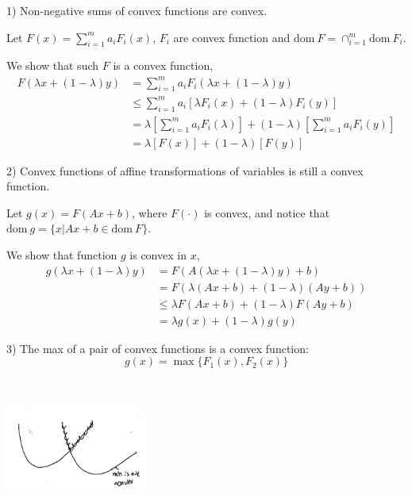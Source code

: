 1) Non-negative sums of convex functions are convex.

Let $F(x) =\sum^m_{i=1}a_iF_i(x)$, $F_i$ are convex function and $\text{dom}\ F = \cap^m_{i=1}\text{dom}\ F_i$. 

We show that such $F$ is a convex function,
\begin{align*}
F(\lambda x + (1-\lambda)y) 
&= \sum^m_{i=1}a_iF_i(\lambda x + (1-\lambda)y)\\
&\leq \sum^m_{i=1}a_i[\lambda F_i(x) + (1-\lambda)F_i(y)]\\
&= \lambda[\sum^m_{i=1}a_iF_i(\lambda)] + (1-\lambda)[\sum^m_{i=1}a_iF_i(y)]\\
&= \lambda[F(x)] + (1-\lambda)[F(y)]
\end{align*}

2) Convex functions of affine transformations of variables is still a convex function.

Let $g(x) =F(Ax + b)$, where $F(\cdot)$ is convex, and notice that $\text{dom}\ g = \{x|Ax + b \in\text{dom}\ F \}$. 

We show that function $g$ is convex in $x$,
\begin{align*}
g(\lambda x + (1-\lambda)y) &= F(A(\lambda x + (1-\lambda)y) + b)\\
&= F(\lambda(Ax + b) + (1-\lambda)(Ay+b))\\
&\leq \lambda F(Ax + b) + (1-\lambda)F(Ay+b)\\
&= \lambda g(x) + (1-\lambda)g(y)
\end{align*}


3) The max of a pair of convex functions is a convex function:
\begin{equation*}
g(x) = \max\{F_1(x), F_2(x) \}
\end{equation*}


\begin{marginfigure}
	\centering
	\includegraphics[width=1.8in,height=1.8in]{figures/ch08/figure1030_14.png}
\end{marginfigure}




